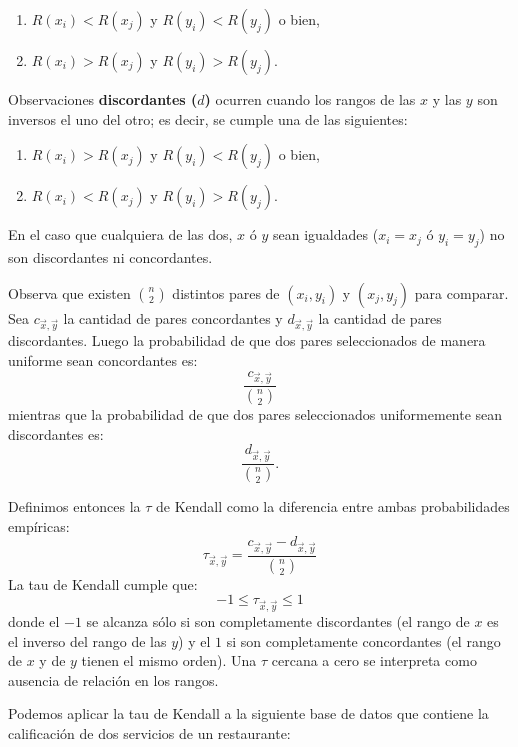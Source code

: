 \documentclass[
]{book}
\begin{document}
\begin{enumerate}
\def\labelenumi{\arabic{enumi}.}
\item
  \(R(x_i) < R(x_j)\) y \(R(y_i) < R(y_j)\) o bien,
\item
  \(R(x_i) > R(x_j)\) y \(R(y_i) > R(y_j)\).
\end{enumerate}

Observaciones \textbf{discordantes (\(d\))} ocurren cuando los rangos de las \(x\) y las \(y\) son inversos el uno del otro; es decir, se cumple una de las siguientes:

\begin{enumerate}
\def\labelenumi{\arabic{enumi}.}
\item
  \(R(x_i) > R(x_j)\) y \(R(y_i) < R(y_j)\) o bien,
\item
  \(R(x_i) < R(x_j)\) y \(R(y_i) > R(y_j)\).
\end{enumerate}

En el caso que cualquiera de las dos, \(x\) ó \(y\) sean igualdades (\(x_i = x_j\) ó \(y_i = y_j\)) no son discordantes ni concordantes.

Observa que existen \(\binom{n}{2}\) distintos pares de \((x_i,y_i)\) y \((x_j,y_j)\) para comparar. Sea \(c_{\vec{x},\vec{y}}\) la cantidad de pares concordantes y \(d_{\vec{x},\vec{y}}\) la cantidad de pares discordantes. Luego la probabilidad de que dos pares seleccionados de manera uniforme sean concordantes es:
\[
\dfrac{c_{\vec{x},\vec{y}}}{\binom{n}{2}}
\]
mientras que la probabilidad de que dos pares seleccionados uniformemente sean discordantes es:
\[
\dfrac{d_{\vec{x},\vec{y}}}{\binom{n}{2}}.
\]

Definimos entonces la \(\tau\) de Kendall como la diferencia entre ambas probabilidades empíricas:
\[
\tau_{\vec{x},\vec{y}} = \dfrac{c_{\vec{x},\vec{y}} - d_{\vec{x},\vec{y}}}{\binom{n}{2}}
\]
La tau de Kendall cumple que:
\[
-1 \leq \tau_{\vec{x},\vec{y}} \leq 1
\]
donde el \(-1\) se alcanza sólo si son completamente discordantes (el rango de \(x\) es el inverso del rango de las \(y\)) y el \(1\) si son completamente concordantes (el rango de \(x\) y de \(y\) tienen el mismo orden). Una \(\tau\) cercana a cero se interpreta como ausencia de relación en los rangos.

Podemos aplicar la tau de Kendall a la siguiente base de datos que contiene la calificación de dos servicios de un restaurante:
\end{document}
